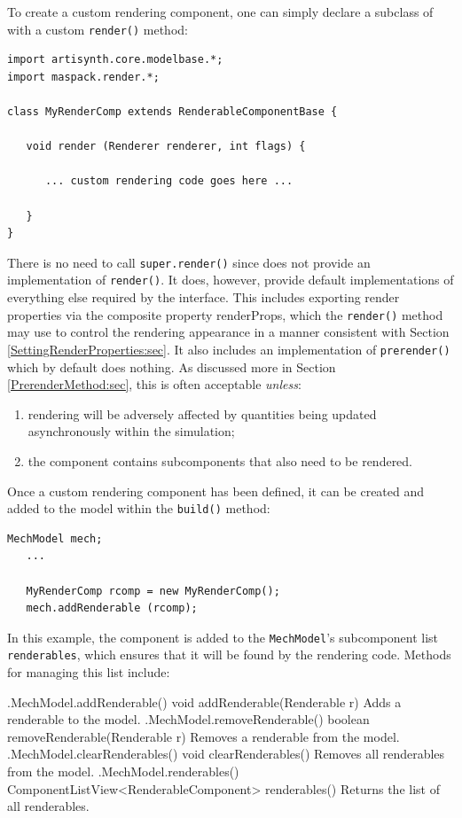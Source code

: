 To create a custom rendering component, one can simply declare a subclass
of 
with a custom {\tt render()} method:
%
\begin{lstlisting}[]
import artisynth.core.modelbase.*;
import maspack.render.*;

class MyRenderComp extends RenderableComponentBase {
  
   void render (Renderer renderer, int flags) {
      
      ... custom rendering code goes here ...

   }
}
\end{lstlisting}
%
There is no need to call {\tt super.render()} since 
does not provide an implementation of {\tt render()}.  It does,
however, provide default implementations of everything else required
by the  interface. This includes
exporting render properties via the composite property {\sf
renderProps}, which the {\tt render()} method may use to control the
rendering appearance in a manner consistent with
Section \ref{SettingRenderProperties:sec}. It also includes an
implementation of {\tt prerender()} which by default does nothing.  As
discussed more in Section \ref{PrerenderMethod:sec}, this is often
acceptable {\it unless}:

\begin{enumerate}

\item rendering will be adversely affected by quantities
being updated asynchronously within the simulation;

\item the component contains subcomponents that also need to be rendered.

\end{enumerate}

Once a custom rendering component has been defined, it can be created
and added to the model within the {\tt build()} method:
%
\begin{lstlisting}[]
   MechModel mech; 
   ...

   MyRenderComp rcomp = new MyRenderComp();
   mech.addRenderable (rcomp);
\end{lstlisting}
%
In this example, the component is added to the {\tt MechModel}'s
subcomponent list {\tt renderables}, which ensures that it will be
found by the rendering code. Methods for managing this list include:
%
\begin{methodtable}{0.55}{0.45}
\midline
%
\methodentry
{\mech.MechModel.addRenderable()}
{void addRenderable(Renderable r)}%
{Adds a renderable to the model.}%
%
\methodentry
{\mech.MechModel.removeRenderable()}
{boolean removeRenderable(Renderable r)}%
{Removes a renderable from the model.}%
%
\methodentry
{\mech.MechModel.clearRenderables()}
{void clearRenderables()}%
{Removes all renderables from the model.}%
%
\methodentry
{\mech.MechModel.renderables()}
{ComponentListView<RenderableComponent> renderables()}%
{Returns the list of all renderables.}%
\midline
\end{methodtable}
%

